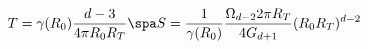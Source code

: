 \begin{equation}
\label{neutTS}
T = \gamma(R_0) \frac{d-3}{4\pi R_0 R_T}
\spa
S = \frac{1}{\gamma(R_0)} \frac{\Omega_{d-2} 2\pi R_T}{4G_{d+1}}
(R_0 R_T)^{d-2}
\end{equation}

